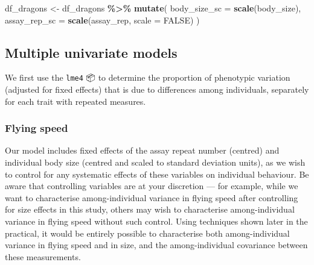 \documentclass[
  12pt,
]{book}
\newenvironment{Shaded}{\begin{snugshade}}{\end{snugshade}}
\newcommand{\DataTypeTok}[1]{\textcolor[rgb]{0.13,0.29,0.53}{#1}}
\newcommand{\KeywordTok}[1]{\textcolor[rgb]{0.13,0.29,0.53}{\textbf{#1}}}
\newcommand{\NormalTok}[1]{#1}
\newcommand{\OperatorTok}[1]{\textcolor[rgb]{0.81,0.36,0.00}{\textbf{#1}}}
\newcommand{\OtherTok}[1]{\textcolor[rgb]{0.56,0.35,0.01}{#1}}
\newcommand{\StringTok}[1]{\textcolor[rgb]{0.31,0.60,0.02}{#1}}
\begin{document}
\begin{Shaded}
\begin{Highlighting}[]
\NormalTok{df\_dragons \textless{}{-}}\StringTok{ }\NormalTok{df\_dragons }\OperatorTok{\%\textgreater{}\%}
\StringTok{  }\KeywordTok{mutate}\NormalTok{(}
    \DataTypeTok{body\_size\_sc =} \KeywordTok{scale}\NormalTok{(body\_size),}
    \DataTypeTok{assay\_rep\_sc =} \KeywordTok{scale}\NormalTok{(assay\_rep, }\DataTypeTok{scale =} \OtherTok{FALSE}\NormalTok{)}
\NormalTok{  )}
\end{Highlighting}
\end{Shaded}

\hypertarget{multiple-univariate-models}{%
\subsection{Multiple univariate models}\label{multiple-univariate-models}}

We first use the \texttt{lme4} 📦 to determine the proportion of phenotypic variation (adjusted for fixed effects) that is due to differences among individuals, separately for each trait with repeated measures.

\hypertarget{flying-speed}{%
\subsubsection{Flying speed}\label{flying-speed}}

Our model includes fixed effects of the assay repeat number (centred) and individual body size (centred and scaled to standard deviation units), as we wish to control for any systematic effects of these variables on individual behaviour. Be aware that controlling variables are at your discretion --- for example, while we want to characterise among-individual variance in flying speed after controlling for size effects in this study, others may wish to characterise among-individual variance in flying speed without such control. Using techniques shown later in the practical, it would be entirely possible to characterise both among-individual variance in flying speed and in size, and the among-individual covariance between these measurements.
\end{document}
